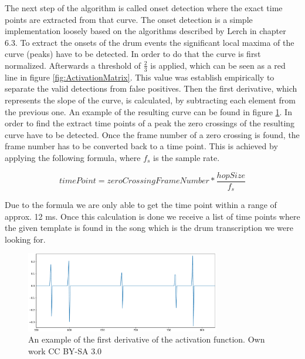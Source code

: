 \documentclass{article}
\begin{document}
The next step of the algorithm is called onset detection where the exact time points are extracted from that curve.
The onset detection is a simple implementation loosely based on the algorithms described by Lerch \cite{lerch2012book} in chapter 6.3.
To extract the onsets of the drum events the significant local maxima of the curve (peaks) have to be detected.
In order to do that the curve is first normalized.
Afterwards a threshold of $\frac{2}{3}$ is applied, which can be seen as a red line in figure \ref{fig:ActivationMatrix}.
This value was establish empirically to separate the valid detections from false positives.
Then the first derivative, which represents the slope of the curve, is calculated, by subtracting each element from the previous one.
An example of the resulting curve can be found in figure \ref{fig:Ableitung}.
In order to find the extract time points of a peak the zero crossings of the resulting curve have to be detected.
Once the frame number of a zero crossing is found, the frame number has to be converted back to a time point.
This is achieved by applying the following formula, where $f_s$ is the sample rate.

\[
timePoint = zeroCrossingFrameNumber * \frac{hopSize}{f_s}
\]

Due to the formula we are only able to get the time point within a range of approx. 12 ms.
Once this calculation is done we receive a list of time points where the given template is found in the song which is the drum transcription we were looking for.

\begin{figure}[htb]

\begin{minipage}[b]{1.0\linewidth}
  \centering
  \centerline{\includegraphics[width=8.5cm]{figures/Ableitung}}
  \medskip
\end{minipage}

\caption{An example of the first derivative of the activation function. \scriptsize{\textsf{\textcopyright} Own work CC BY-SA 3.0}}
\label{fig:Ableitung}

\end{figure}
\end{document}
